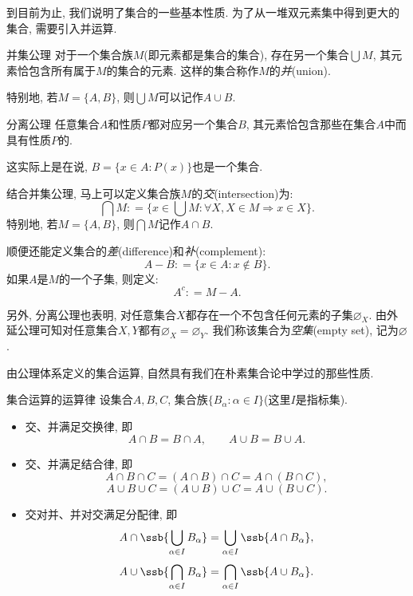 到目前为止, 我们说明了集合的一些基本性质. 为了从一堆双元素集中得到更大的集合, 需要引入并运算. 

\begin{axiom}{并集公理}
	对于一个集合族$M$(即元素都是集合的集合), 存在另一个集合$\bigcup M$, 其元素恰包含所有属于$M$的集合的元素. 这样的集合称作$M$的\textit{并}(union). 
\end{axiom}

特别地, 若$M=\{ A, B \}$, 则$\bigcup M$可以记作$A \cup B$. 

\begin{axiom}{分离公理}
	任意集合$A$和性质$P$都对应另一个集合$B$, 其元素恰包含那些在集合$A$中而具有性质$P$的. 
\end{axiom}

这实际上是在说, $B=\{ x \in A :  P(x) \}$也是一个集合. 

结合并集公理, 马上可以定义集合族$M$的\textit{交}(intersection)为: $$\bigcap M : = \{ x \in \bigcup M :  \forall X, X \in M \Rightarrow x \in X \}.$$
特别地, 若$M= \{ A, B \}$, 则$\bigcap M$记作$A \cap B$. 

顺便还能定义集合的\textit{差}(difference)和\textit{补}(complement): $$A - B : = \{ x \in A :  x \notin B \}.$$
如果$A$是$M$的一个子集, 则定义: $$A^c : = M - A.$$

另外, 分离公理也表明, 对任意集合$X$都存在一个不包含任何元素的子集$\varnothing _X$. 由外延公理可知对任意集合$X, Y$都有$\varnothing _X = \varnothing _Y$. 我们称该集合为\textit{空集}(empty set), 记为$\varnothing$. 

由公理体系定义的集合运算, 自然具有我们在朴素集合论中学过的那些性质. 

\begin{proposition}{集合运算的运算律}
	设集合$A, B, C$, 集合族$\{ B_{\alpha} :  \alpha \in I \}$(这里$I$是指标集). 
	\begin{itemize}
		\item 交、并满足交换律, 即$$A \cap B = B \cap A,  \qquad A \cup B = B \cup A.$$
		\item 交、并满足结合律, 即
	$$A \cap B \cap C = (A \cap B) \cap C = A \cap (B \cap C), $$
	$$A \cup B \cup C = (A \cup B) \cup C = A \cup (B \cup C).$$
		\item 交对并、并对交满足分配律, 即
	$$A \cap \ssb{\bigcup_{\alpha \in I} B_\alpha} = \bigcup_{\alpha \in I} \ssb{A \cap B_{\alpha}}, $$
	$$A \cup \ssb{\bigcap_{\alpha \in I} B_\alpha} = \bigcap_{\alpha \in I} \ssb{A \cup B_{\alpha}}.$$
	\end{itemize}
\end{proposition}

